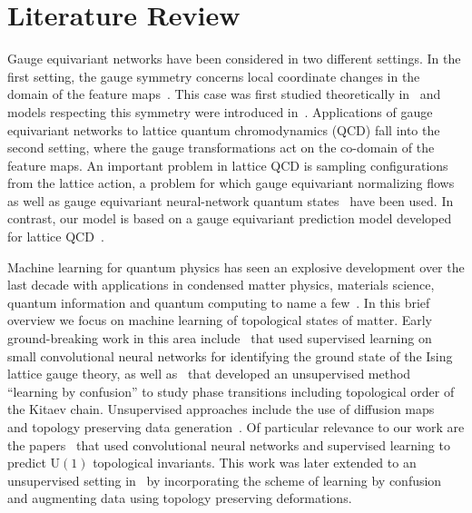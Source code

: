 \section{Literature Review}
Gauge equivariant networks have been considered in two different settings. In the first setting, the gauge symmetry concerns local coordinate changes in the domain of the feature maps~\cite{bronstein2021,weiler2023EquivariantAndCoordinateIndependentCNNs,gerken2023}. This case was first studied theoretically in~\cite{cheng2019} and models respecting this symmetry were introduced in~\cite{cohen2019,dehaan2020}. Applications of gauge equivariant networks to lattice quantum chromodynamics (QCD) fall into the second setting, where the gauge transformations act on the co-domain of the feature maps. An important problem in lattice QCD is sampling configurations from the lattice action, a problem for which gauge equivariant normalizing flows~\cite{kanwar2020,boyda2021,nicoli2021,bacchio2023,abbott2023} as well as gauge equivariant neural-network quantum states~\cite{luo2021a} have been used. In contrast, our model is based on a gauge equivariant prediction model developed for lattice QCD~\cite{favoni2022}.


Machine learning for quantum physics has seen an explosive development over the last decade with applications in condensed matter physics, materials science, quantum information and quantum computing to name a few~\cite{Carleo_2019,Carrasquilla_2020,Krenn,dawid2023modernapplicationsmachinelearning}.  In this brief overview we focus on machine learning of topological states of matter. Early ground-breaking work in this area include~\cite{Carrasquilla_2017} that used supervised learning on small convolutional neural networks for identifying the ground state of the Ising lattice gauge theory, as well as~\cite{van_Nieuwenburg_2017} that developed an unsupervised method “learning by confusion” to study phase transitions including topological order of the Kitaev chain. Unsupervised approaches include the use of diffusion maps~\cite{PhysRevB.102.134213} and topology preserving data generation~\cite{PhysRevLett.124.226401}. Of particular relevance to our work are the papers~\cite{Zhang_2018,PhysRevB.98.085402} that used convolutional neural networks and supervised learning to predict $\mathrm{U}(1)$ topological invariants.
This work was later extended to an unsupervised setting in~\cite{PhysRevResearch.2.013354,balabanov2020unsupervised} by incorporating the scheme of learning by confusion and augmenting data using topology preserving deformations. 
